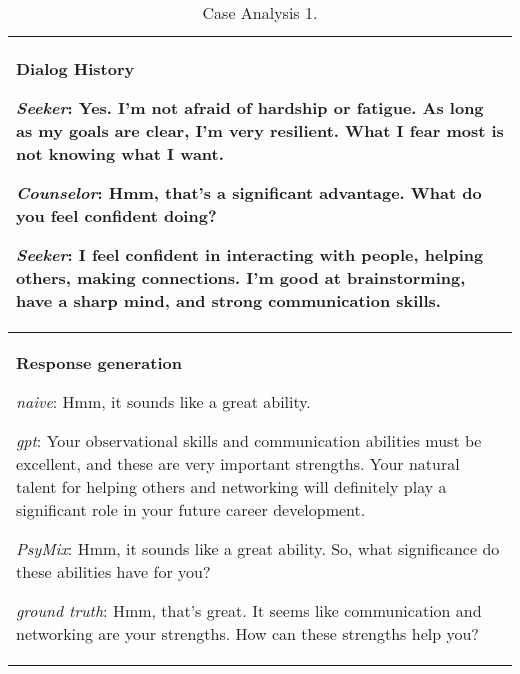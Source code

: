 \begin{table*}[htbp]
    \centering
    \begin{tabular}{|p{15.5cm}|}
    \hline
    \textbf{Dialog History} 
    \par \textit{Seeker}: Yes. I'm not afraid of hardship or fatigue. As long as my goals are clear, I'm very resilient. What I fear most is not knowing what I want.
    \par \textit{Counselor}: Hmm, that's a significant advantage. What do you feel confident doing?
    \par \textit{Seeker}: I feel confident in interacting with people, helping others, making connections. I'm good at brainstorming, have a sharp mind, and strong communication skills.
    \\
    \hline
    \textbf{Response generation} 
    \par \textit{naive}: \textcolor{orange!50!brown}{Hmm, it sounds like a great ability.}
    \par \textit{gpt}: \textcolor{orange!50!brown}{Your observational skills and communication abilities must be excellent,} and these are very important strengths. Your natural talent for helping others and networking will definitely play a significant role in your future career development.
    \par \textit{PsyMix}: \textcolor{orange!50!brown}{Hmm, it sounds like a great ability.} \textcolor{green!50!black}{So, what significance do these abilities have for you?}
    \par \textit{ground truth}: \textcolor{orange!50!brown}{Hmm, that's great. } \textcolor{blue!50!black}{It seems like communication and networking are your strengths.}\textcolor{green!50!black}{ How can these strengths help you?}


    \\
    \hline
    \end{tabular}
    \caption{Case Analysis 1.} 
    \label{tab:case_anapysis_4}
\end{table*}



